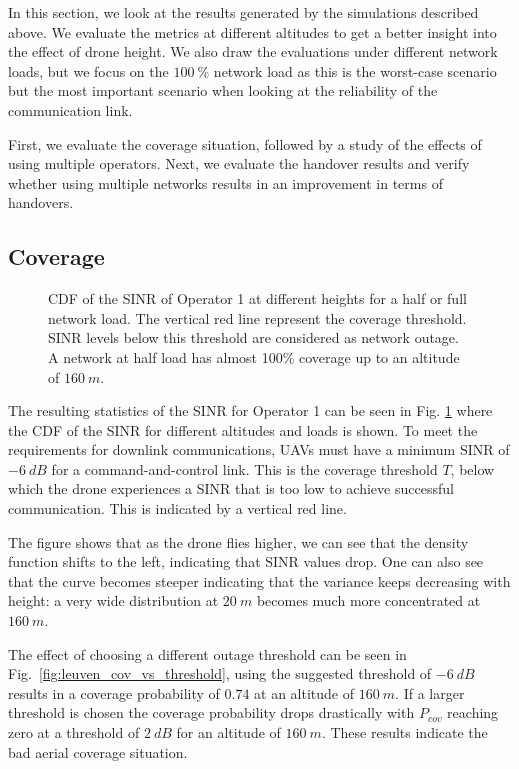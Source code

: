 \documentclass[conference,twocolumn,a4paper]{IEEEtran}
\begin{document}
\par In this section, we look at the results generated by the simulations described above. We evaluate the metrics at different altitudes to get a better insight into the effect of drone height. We also draw the evaluations under different network loads, but we focus on the $100~\%$ network load as this is the worst-case scenario but the most important scenario when looking at the reliability of the communication link.
\par First, we evaluate the coverage situation, followed by a study of the effects of using multiple operators. %
Next, we evaluate the handover results and verify whether using multiple networks results in an improvement in terms of handovers.

\subsection{Coverage}
\begin{figure}[]
    \centering %
	 \resizebox{0.9\linewidth}{!}{
    
    }
    \caption{CDF of the SINR of Operator 1 at different heights for a half or full network load. The vertical red line represent the coverage threshold. SINR levels below this threshold are considered as network outage. A network at half load has almost 100\% coverage up to an altitude of $160~m$.}
    \label{fig:leuven_sinr}
\end{figure}
\par The resulting statistics of the SINR for Operator 1 can be seen in Fig. \ref{fig:leuven_sinr} where the CDF of the SINR for different altitudes and loads is shown. To meet the requirements for downlink communications, UAVs must have a minimum SINR of $-6~dB$ \cite{colpaert2018aerial} for a command-and-control link. This is the coverage threshold $T$, below which the drone experiences a SINR that is too low to achieve successful communication. This is indicated by a vertical red line.

\par The figure shows that as the drone flies higher, we can see that the density function shifts to the left, indicating that SINR values drop. One can also see that the curve becomes steeper indicating that the variance keeps decreasing with height: a very wide distribution at $20~m$ becomes much more concentrated at $160~m$.

\par The effect of choosing a different outage threshold can be seen in Fig.~\ref{fig:leuven_cov_vs_threshold}, using the suggested threshold of $-6~dB$ results in a coverage probability of $0.74$ at an altitude of $160~m$. If a larger threshold is chosen the coverage probability drops drastically with $P_{cov}$ reaching zero at a threshold of $2~dB$ for an altitude of $160~m$. These results indicate the bad aerial coverage situation.
\end{document}

